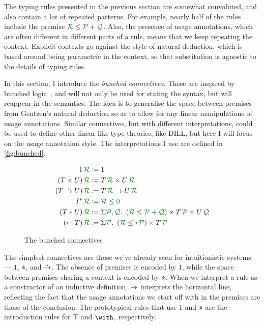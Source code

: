 
The typing rules presented in the previous section are somewhat convoluted,
and also contain a lot of repeated patterns.
For example, nearly half of the rules include the premise
$\grR \leq \grP + \grQ$.
Also, the presence of usage annotations, which are often different in different
parts of a rule, means that we keep repeating the context.
Explicit contexts go against the style of natural deduction, which is based
around being parametric in the context, so that substitution is agnostic to the
details of typing rules.

In this section, I introduce the \emph{bunched connectives}.
These are inspired by bunched logic~\cite{oHP99}, and will not only be used for
stating the syntax, but will reappear in the semantics.
The idea is to generalise the space between premises from Gentzen's natural
deduction so as to allow for any linear manipulations of usage annotations.
Similar connectives, but with different interpretations, could be used to
define other linear-like type theories, like DILL, but here I will focus on the
usage annotation style.
The interpretations I use are defined in \autoref{fig:bunched}.

\begin{figure}
  \begin{align*}
    \dot1\,\grR &\coloneqq 1 \\
    (T \dottimes U)\,\grR &\coloneqq T\,\grR \times U\,\grR \\
    (T \dotto U)\,\grR &\coloneqq T\,\grR \to U\,\grR \\
    I^*\,\grR &\coloneqq \grR \leq \gr0 \\
    (T \sep U)\,\grR &\coloneqq \Sigma \grP,\grQ.~ \plr{\grR \leq \grP + \grQ}
                       \times T\,\grP \times U\,\grQ \\
    (\gr r \cdot T)\,\grR &\coloneqq \Sigma \grP.~ \plr{\grR \leq \gr r\grP}
                       \times T\,\grP
  \end{align*}
  \caption{The bunched connectives}
  \label{fig:bunched}
\end{figure}

The simplest connectives are those we've already seen for intuitionistic
systems --- $\dot1$, $\dottimes$, and $\mathrel{\dot\to}$.
The absence of premises is encoded by $\dot1$, while the space between premises
sharing a context is encoded by $\dottimes$.
When we interpret a rule as a constructor of an inductive definition, $\mathrel{\dot\to}$
interprets the horizontal line, reflecting the fact that the usage annotations
we start off with in the premises are those of the conclusion.
The prototypical rules that use $\dot1$ and $\dottimes$ are the introduction
rules for $\top$ and $\with$, respectively.

